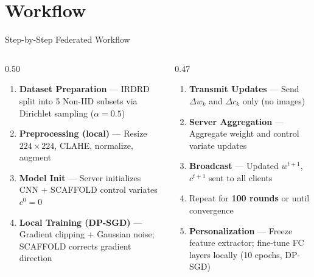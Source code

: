 \documentclass[aspectratio=169, 11pt]{beamer}
\begin{document}
\section{Workflow}

\begin{frame}{Step-by-Step Federated Workflow}
  \begin{columns}[T]
    \begin{column}{0.50\textwidth}
      \begin{enumerate}\small
        \item[\textbf{1.}] \textbf{Dataset Preparation} --- IRDRD split into 5 Non-IID subsets via Dirichlet sampling ($\alpha = 0.5$)
        \item[\textbf{2.}] \textbf{Preprocessing (local)} --- Resize $224\times224$, CLAHE, normalize, augment
        \item[\textbf{3.}] \textbf{Model Init} --- Server initializes CNN + SCAFFOLD control variates $c^0 = 0$
        \item[\textbf{4.}] \textbf{Local Training (DP-SGD)} --- Gradient clipping + Gaussian noise; SCAFFOLD corrects gradient direction
      \end{enumerate}
    \end{column}
    \begin{column}{0.47\textwidth}
      \begin{enumerate}\small
        \item[\textbf{5.}] \textbf{Transmit Updates} --- Send $\Delta w_k$ and $\Delta c_k$ only (no images)
        \item[\textbf{6.}] \textbf{Server Aggregation} --- Aggregate weight and control variate updates
        \item[\textbf{7.}] \textbf{Broadcast} --- Updated $w^{t+1}$, $c^{t+1}$ sent to all clients
        \item[\textbf{8.}] Repeat for \textbf{100 rounds} or until convergence
        \item[\textbf{9.}] \textbf{Personalization} --- Freeze feature extractor; fine-tune FC layers locally (10 epochs, DP-SGD)
      \end{enumerate}
    \end{column}
  \end{columns}
\end{frame}
\end{document}
